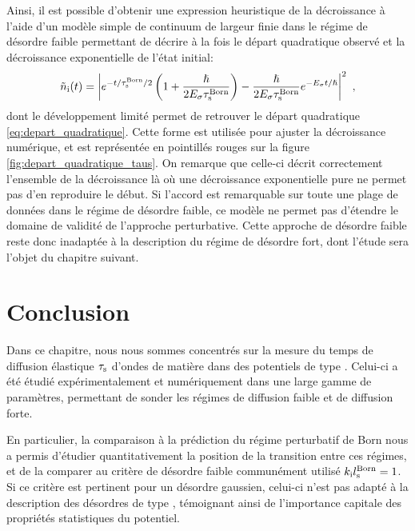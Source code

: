 Ainsi, il est possible d'obtenir une expression heuristique de la décroissance à l'aide d'un modèle simple de continuum de largeur finie dans le régime de désordre faible \citep{grynberg2010introduction} permettant de décrire à la fois le départ quadratique observé et la décroissance exponentielle de l'état initial:
\begin{equation}
\tilde{n}_{\mathrm{i}}(t)=\left| e^{-t/\tau_{\mathrm{s}}^{\mathrm{Born}}/2} \left(1+\frac{\hslash}{2E_{\sigma}\tau_{\mathrm{s}}^{\mathrm{Born}}} \right) - \frac{\hslash}{2E_{\sigma}\tau_{\mathrm{s}}^{\mathrm{Born}}} e^{-E_{\sigma} t/\hslash}\right|^2 \text{ ,}
\label{eq:depart_quadratique_total}
\end{equation}
dont le développement limité permet de retrouver le départ quadratique \ref{eq:depart_quadratique}. Cette forme est utilisée pour ajuster la décroissance numérique, et est représentée en pointillés rouges sur la figure \ref{fig:depart_quadratique_taus}. On remarque que celle-ci décrit correctement l'ensemble de la décroissance là où une décroissance exponentielle pure ne permet pas d'en reproduire le début. Si l'accord est remarquable sur toute une plage de données dans le régime de désordre faible, ce modèle ne permet pas d'étendre le domaine de validité de l'approche perturbative. Cette approche de désordre faible reste donc inadaptée à la description du régime de désordre fort, dont l'étude sera l'objet du chapitre suivant.


\section{Conclusion}
Dans ce chapitre, nous nous sommes concentrés sur la mesure du temps de diffusion élastique $\tau_{\mathrm{s}}$ d'ondes de matière dans des potentiels de type \speckle . Celui-ci a été étudié expérimentalement et numériquement dans une large gamme de paramètres, permettant de sonder les régimes de diffusion faible et de diffusion forte. 

En particulier, la comparaison à la prédiction du régime perturbatif de Born nous a permis d'étudier quantitativement la position de la transition entre ces régimes, et de la comparer au critère de désordre faible communément utilisé $k_{\mathrm{i}}l_{\mathrm{s}}^{\mathrm{Born}}=1$. Si ce critère est pertinent pour un désordre gaussien, celui-ci n'est pas adapté à la description des désordres de type \speckle , témoignant ainsi de l'importance capitale des propriétés statistiques du potentiel. 